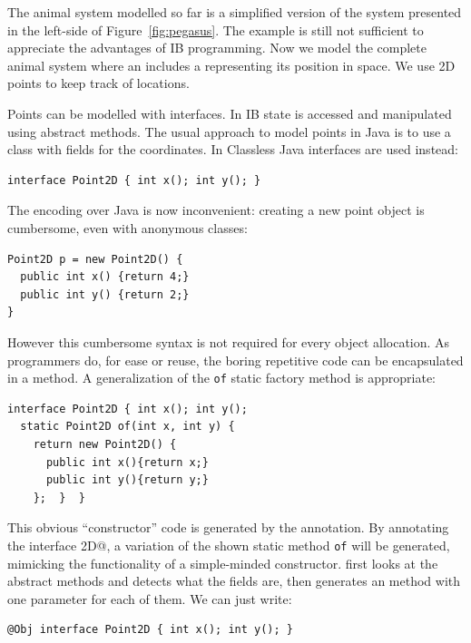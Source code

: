 The animal system modelled so far is a simplified version of the
system presented in the left-side of Figure~\ref{fig:pegasus}.
The example is still not sufficient to appreciate the advantages of IB
programming.
Now we model the complete animal system where an \Q@Animal@ includes a \Q@location@
representing its position in space. We use 2D points to keep track of locations.

Points can be modelled with interfaces.
 In IB
 state is accessed and
manipulated using abstract methods.  The usual approach to model
points in Java is to use a class with fields for the coordinates.
In Classless Java interfaces are used instead:

\begin{lstlisting}
interface Point2D { int x(); int y(); }
\end{lstlisting}

\noindent The encoding over Java is now inconvenient: creating a new point object is cumbersome, even
with anonymous classes:

\begin{lstlisting}
Point2D p = new Point2D() {
  public int x() {return 4;}
  public int y() {return 2;}
}
\end{lstlisting}

\noindent However this cumbersome syntax is not required for every
object allocation. As programmers do, for ease or reuse, the boring
repetitive code can be encapsulated in a method. A generalization of the
\texttt{of} static factory method is appropriate:%
\begin{lstlisting}
interface Point2D { int x(); int y();
  static Point2D of(int x, int y) {
    return new Point2D() {
      public int x(){return x;}
      public int y(){return y;}
    };  }  }
\end{lstlisting}

\vspace{-5pt}
This obvious ``constructor'' code is generated by the \mixin
annotation.  By annotating the interface \Q@Point2D@, a variation of the shown
static method \texttt{of} will be generated, mimicking the functionality of a
simple-minded constructor. \mixin first looks at the abstract methods and detects
what the fields are, then generates an \Q@of@ method with one parameter for each
of them. We can just write:

\begin{lstlisting}
@Obj interface Point2D { int x(); int y(); }
\end{lstlisting}

